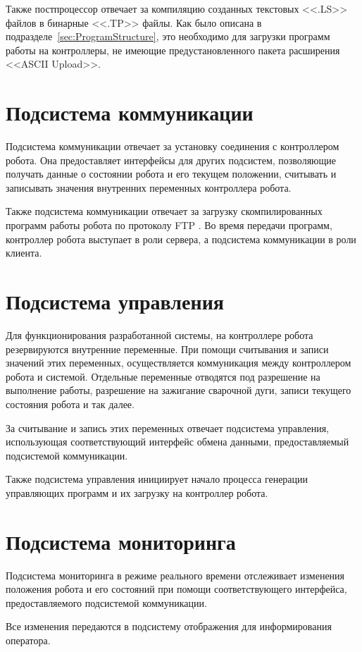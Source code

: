Также постпроцессор отвечает за компиляцию созданных текстовых <<.LS>> файлов в бинарные <<.TP>> файлы.
Как было описана в подразделе~\ref{sec:ProgramStructure}, это необходимо для загрузки программ работы на контроллеры, не имеющие предустановленного пакета расширения <<ASCII Upload>>.


\section{Подсистема коммуникации}
Подсистема коммуникации отвечает за установку соединения с контроллером робота.
Она предоставляет интерфейсы для других подсистем, позволяющие получать данные о состоянии робота и его текущем положении, считывать и записывать значения внутренних переменных контроллера робота.

Также подсистема коммуникации отвечает за загрузку скомпилированных программ работы робота по протоколу FTP .
Во время передачи программ, контроллер робота выступает в роли сервера, а подсистема коммуникации в роли клиента.


\section{Подсистема управления}
Для функционирования разработанной системы, на контроллере робота резервируются внутренние переменные.
При помощи считывания и записи значений этих переменных, осуществляется коммуникация между контроллером робота и системой.
Отдельные переменные отводятся под разрешение на выполнение работы, разрешение на зажигание сварочной дуги, записи текущего состояния робота и так далее.

За считывание и запись этих переменных отвечает подсистема управления, использующая соответствующий интерфейс обмена данными, предоставляемый подсистемой коммуникации.

Также подсистема управления инициирует начало процесса генерации управляющих программ и их загрузку на контроллер робота.


\section{Подсистема мониторинга}
Подсистема мониторинга в режиме реального времени отслеживает изменения положения робота и его состояний при помощи соответствующего интерфейса, предоставляемого подсистемой коммуникации.

Все изменения передаются в подсистему отображения для информирования оператора.
